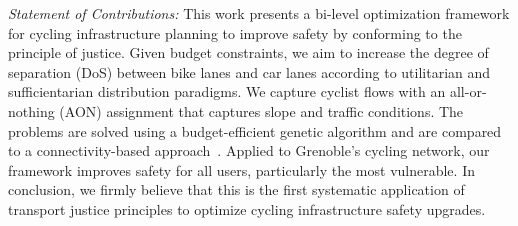 \documentclass[letterpaper, 10 pt, conference]{ieeeconf}  %
\begin{document}
\textit{Statement of Contributions:} This work presents a bi-level optimization framework for cycling infrastructure planning to improve safety by conforming to the principle of justice. Given budget constraints, we aim to increase the degree of separation (DoS) between bike lanes and car lanes according to utilitarian and sufficientarian distribution paradigms.
We capture cyclist flows with an all-or-nothing (AON) assignment that captures slope and traffic conditions. The problems are solved using a budget-efficient genetic algorithm and are compared to a connectivity-based approach~\cite{2024graphbased}.
Applied to Grenoble’s cycling network, our framework improves safety for all users, particularly the most vulnerable.
In conclusion, we firmly believe that this is the first systematic application of transport justice principles to optimize cycling infrastructure safety upgrades.      










\end{document}
